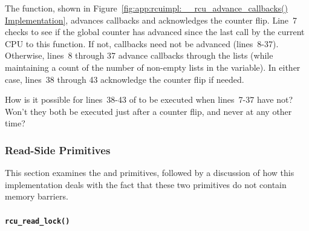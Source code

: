 The  function, shown in
Figure~\ref{fig:app:rcuimpl:__rcu_advance_callbacks() Implementation},
advances callbacks and acknowledges the counter flip.
Line~7 checks to see if the global 
counter has advanced since the last call by the current CPU to this
function.
If not, callbacks need not be advanced (lines~8-37).
Otherwise, lines~8 through 37 advance callbacks through the lists
(while maintaining a count of the number of non-empty lists in the
 variable).
In either case, lines~38 through 43 acknowledge the counter flip
if needed.

\QuickQuiz{}
	How is it possible for lines~38-43 of
	 to be executed when
	lines~7-37 have not?
	Won't they both be executed just after a counter flip, and
	never at any other time?
 \QuickQuizEnd


\subsubsection{Read-Side Primitives}
\label{app:rcuimpl:Read-Side Primitives}

This section examines the  and
 primitives, followed by a
discussion of how this implementation deals with the fact
that these two primitives do not contain memory barriers.

\paragraph{{\tt rcu\_read\_lock()}}
\label{app:rcuimpl:rcu_read_lock()}

